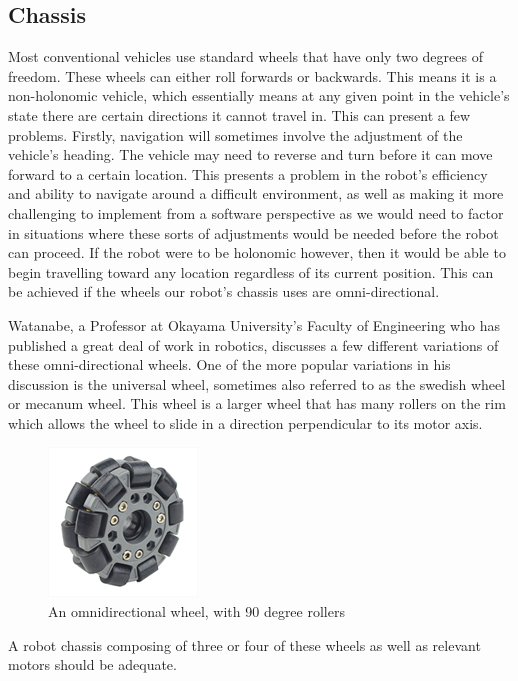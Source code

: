 				\subsection{Chassis}
				Most conventional vehicles use standard wheels that have only two degrees of freedom. These wheels can either roll forwards or backwards. This means it is a non-holonomic vehicle, which essentially means at any given point in the vehicle's state there are certain directions it cannot travel in. This can present a few problems. Firstly, navigation will sometimes involve the adjustment of the vehicle's heading. The vehicle may need to reverse and turn before it can move forward to a certain location. This presents a problem in the robot's efficiency and ability to navigate around a difficult environment, as well as making it more challenging to implement from a software perspective as we would need to factor in situations where these sorts of adjustments would be needed before the robot can proceed. If the robot were to be holonomic however, then it would be able to begin travelling toward any location regardless of its current position. This can be achieved if the wheels our robot's chassis uses are omni-directional.	
				
				Watanabe\citep{watanabe1998control}, a Professor at Okayama University's Faculty of Engineering who has published a great deal of work in robotics, discusses a few different variations of these omni-directional wheels. One of the more popular variations in his discussion is the universal wheel, sometimes also referred to as the swedish wheel or mecanum wheel. This wheel is a larger wheel that has many rollers on the rim which allows the wheel to slide in a direction perpendicular to its motor axis. 
				
				\begin{figure}[h]
					\centering
					\includegraphics[width=.3\linewidth]{ANALYSIS/90degwheel.png}
					\caption{An omnidirectional wheel, with 90 degree rollers}
					\label{fig:1}
				\end{figure}
				
				A robot chassis composing of three or four of these wheels as well as relevant motors should be adequate.
			
